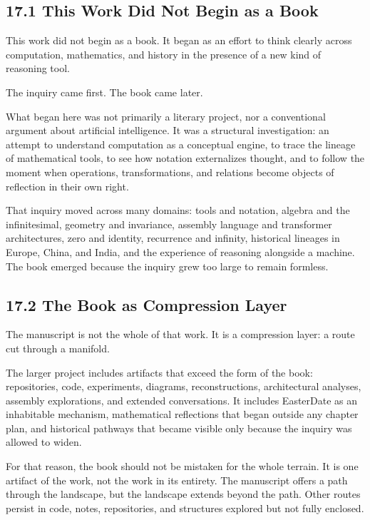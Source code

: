 \hypertarget{this-work-did-not-begin-as-a-book}{%
\subsection{17.1 This Work Did Not Begin as a
Book}\label{this-work-did-not-begin-as-a-book}}

This work did not begin as a book. It began as an effort to think
clearly across computation, mathematics, and history in the presence of
a new kind of reasoning tool.

The inquiry came first. The book came later.

What began here was not primarily a literary project, nor a conventional
argument about artificial intelligence. It was a structural
investigation: an attempt to understand computation as a conceptual
engine, to trace the lineage of mathematical tools, to see how notation
externalizes thought, and to follow the moment when operations,
transformations, and relations become objects of reflection in their own
right.

That inquiry moved across many domains: tools and notation, algebra and
the infinitesimal, geometry and invariance, assembly language and
transformer architectures, zero and identity, recurrence and infinity,
historical lineages in Europe, China, and India, and the experience of
reasoning alongside a machine. The book emerged because the inquiry grew
too large to remain formless.

\hypertarget{the-book-as-compression-layer}{%
\subsection{17.2 The Book as Compression
Layer}\label{the-book-as-compression-layer}}

The manuscript is not the whole of that work. It is a compression layer:
a route cut through a manifold.

The larger project includes artifacts that exceed the form of the book:
repositories, code, experiments, diagrams, reconstructions,
architectural analyses, assembly explorations, and extended
conversations. It includes EasterDate as an inhabitable mechanism,
mathematical reflections that began outside any chapter plan, and
historical pathways that became visible only because the inquiry was
allowed to widen.

For that reason, the book should not be mistaken for the whole terrain.
It is one artifact of the work, not the work in its entirety. The
manuscript offers a path through the landscape, but the landscape
extends beyond the path. Other routes persist in code, notes,
repositories, and structures explored but not fully enclosed.

